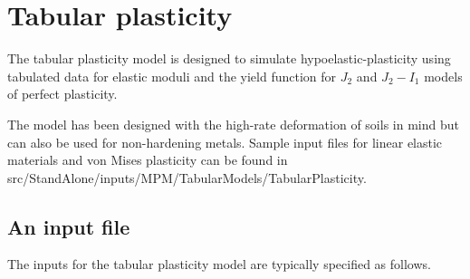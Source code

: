\section{Tabular plasticity}

The tabular plasticity model is designed to simulate hypoelastic-plasticity using 
tabulated data for elastic moduli and the yield function for $J_2$ and $J_2-I_1$ models
of perfect plasticity. 

The model has been designed with the high-rate deformation of soils in mind but can 
also be used for non-hardening metals. Sample input files for linear elastic materials
and von Mises plasticity can be found in 
\textsf{src/StandAlone/inputs/MPM/TabularModels/TabularPlasticity}.

\subsection{An input file}
The inputs for the tabular plasticity model are typically specified as follows.
\lstset{
  language=XML
}
